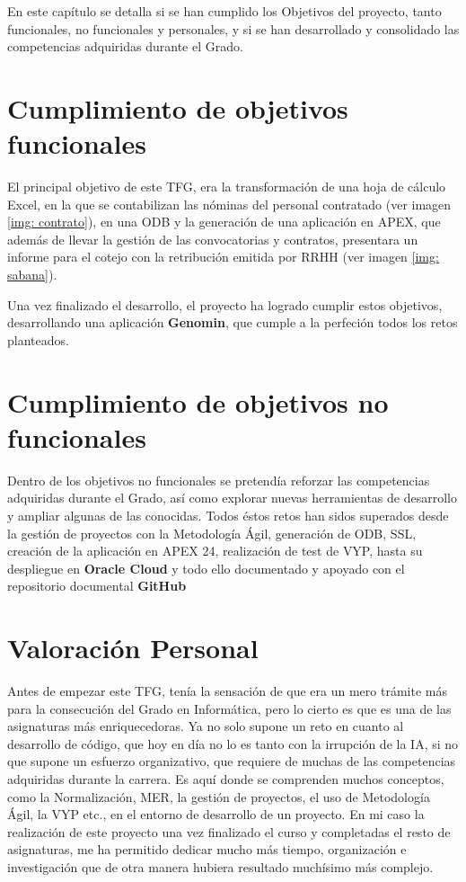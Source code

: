 En este capítulo se detalla si se han cumplido los Objetivos del proyecto, tanto funcionales, no funcionales y personales, y si se han desarrollado y consolidado las competencias adquiridas durante el Grado.

\section{Cumplimiento de objetivos funcionales}
El principal objetivo de este \acrshort{TFG}, era la transformación de una hoja de cálculo Excel, en la que se contabilizan las nóminas del personal contratado (ver imagen \ref{img: contrato}), en una \acrshort{ODB} y la generación de una aplicación en \acrshort{APEX}, que además de llevar la gestión de las convocatorias y contratos, presentara un informe para el cotejo con la retribución emitida por RRHH (ver imagen \ref{img: sabana}).

Una vez finalizado el desarrollo, el proyecto ha logrado cumplir estos objetivos, desarrollando una aplicación \textbf{Genomin}, que cumple a la perfeción todos los retos planteados.

\section{Cumplimiento de objetivos no funcionales}
Dentro de los objetivos no funcionales se pretendía reforzar las competencias adquiridas durante el Grado, así como explorar nuevas herramientas de desarrollo y ampliar algunas de las conocidas. Todos éstos retos han sidos superados desde la gestión de proyectos con la \gls{Metodología Ágil}, generación de \acrshort{ODB}, \acrshort{SSL}, creación de la aplicación en \acrshort{APEX} 24, realización de test de \acrshort{VYP},  hasta su despliegue en \textbf{Oracle Cloud} y todo ello documentado y apoyado con el repositorio documental \textbf{GitHub}

\section{Valoración Personal}
Antes de empezar este \acrshort{TFG}, tenía la sensación de que era un mero trámite más para la consecución del Grado en Informática, pero lo cierto es que es una de las asignaturas más enriquecedoras. Ya no solo supone un reto en cuanto al desarrollo de código, que hoy en día no lo es tanto con la irrupción de la \acrshort{IA}, si no que supone un esfuerzo organizativo, que requiere de muchas de las competencias adquiridas durante la carrera. Es aquí donde se comprenden muchos conceptos, como la \gls{Normalización}, \gls{MER}, la gestión de proyectos, el uso de \gls{Metodología Ágil}, la \acrfull{VYP} etc., en el entorno de desarrollo de un proyecto.
En mi caso la realización de este proyecto una vez finalizado el curso y completadas el resto de asignaturas, me ha permitido dedicar mucho más tiempo, organización e investigación que de otra manera hubiera resultado muchísimo más complejo.

